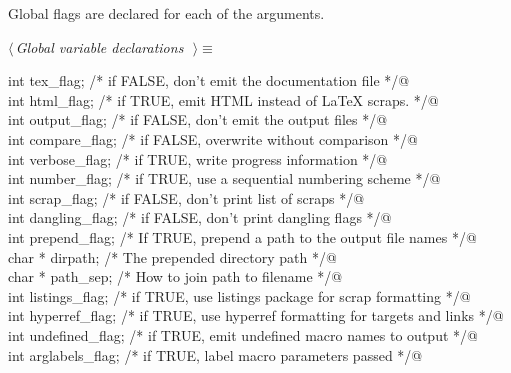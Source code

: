 \documentclass{report}
\begin{document}
\noindent
Global flags are declared for each of the arguments.
\begin{flushleft} \small
\begin{minipage}{\linewidth} \label{scrap16}
$\langle\,${\it Global variable declarations}\nobreak\ {\footnotesize {}}$\,\rangle\equiv$
\vspace{-1ex}
\begin{list}{}{} \item
\mbox{}\verb@extern int tex_flag;      /* if FALSE, don't emit the documentation file */@\\
\mbox{}\verb@extern int html_flag;     /* if TRUE, emit HTML instead of LaTeX scraps. */@\\
\mbox{}\verb@extern int output_flag;   /* if FALSE, don't emit the output files */@\\
\mbox{}\verb@extern int compare_flag;  /* if FALSE, overwrite without comparison */@\\
\mbox{}\verb@extern int verbose_flag;  /* if TRUE, write progress information */@\\
\mbox{}\verb@extern int number_flag;   /* if TRUE, use a sequential numbering scheme */@\\
\mbox{}\verb@extern int scrap_flag;    /* if FALSE, don't print list of scraps */@\\
\mbox{}\verb@extern int dangling_flag;    /* if FALSE, don't print dangling flags */@\\
\mbox{}\verb@extern int prepend_flag;  /* If TRUE, prepend a path to the output file names */@\\
\mbox{}\verb@extern char * dirpath;    /* The prepended directory path */@\\
\mbox{}\verb@extern char * path_sep;   /* How to join path to filename */@\\
\mbox{}\verb@extern int listings_flag;   /* if TRUE, use listings package for scrap formatting */@\\
\mbox{}\verb@extern int hyperref_flag;   /* if TRUE, use hyperref formatting for targets and links */@\\
\mbox{}\verb@extern int undefined_flag;  /* if TRUE, emit undefined macro names to output */@\\
\mbox{}\verb@extern int arglabels_flag;  /* if TRUE, label macro parameters passed */@\\
\mbox{}\verb@@{\NWsep}
\end{list}
\vspace{-1ex}
\footnotesize\addtolength{\baselineskip}{-1ex}

\end{minipage}
\end{flushleft}
\end{document}
